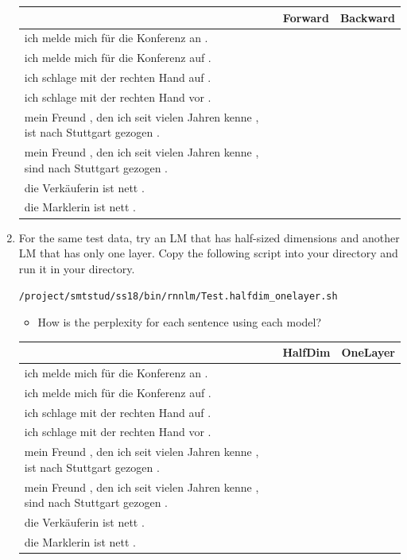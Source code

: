 \documentclass[12pt,fleqn]{article}
\begin{document}
\begin{enumerate}
\begin{table}[ht] 
   \begin{center} 
         \begin{tabular}{|p{12cm}|p{1.5cm}|p{1.8cm}|} \hline 
& Forward & Backward \\  \hline 
ich melde mich f\"{u}r die Konferenz an . &  & \\ \hline
ich melde mich f\"{u}r die Konferenz auf . &  & \\  \hline \hline
ich schlage mit der rechten Hand auf . & & \\ \hline
ich schlage mit der rechten Hand vor . & & \\ \hline \hline
mein Freund , den ich seit vielen Jahren kenne , ist nach Stuttgart gezogen . & & \\ \hline
mein Freund , den ich seit vielen Jahren kenne , sind nach Stuttgart gezogen . & & \\ \hline \hline
die Verkäuferin ist nett . & & \\ \hline
die Marklerin ist nett . & & \\ \hline 
         \end{tabular}
   \end{center}
\end{table}

\item For the same test data, try an LM that has half-sized dimensions and another LM that has only one layer. Copy the following script into your directory and run it in your directory.

\texttt{/project/smtstud/ss18/bin/rnnlm/Test.halfdim\_onelayer.sh} 

\begin{itemize} 
 \item How is the perplexity for each sentence using each model? 
\end{itemize}

\begin{table}[ht] 
   \begin{center} 
         \begin{tabular}{|p{12cm}|p{1.5cm}|p{1.8cm}|} \hline 
& HalfDim & OneLayer \\  \hline 
ich melde mich f\"{u}r die Konferenz an . &  & \\ \hline
ich melde mich f\"{u}r die Konferenz auf . &  & \\  \hline \hline
ich schlage mit der rechten Hand auf . & & \\ \hline
ich schlage mit der rechten Hand vor . & & \\ \hline \hline
mein Freund , den ich seit vielen Jahren kenne , ist nach Stuttgart gezogen . & & \\ \hline
mein Freund , den ich seit vielen Jahren kenne , sind nach Stuttgart gezogen . & & \\ \hline \hline
die Verkäuferin ist nett . & & \\ \hline
die Marklerin ist nett . & & \\ \hline 
         \end{tabular}
   \end{center}
\end{table}


\end{enumerate}
\end{document}
